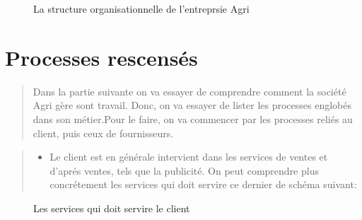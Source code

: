 \documentclass[a4paper]{report}
\begin{document}
\begin{doublespace}
\begin{figure}[H]
	\begin{center} 
		\caption{La structure organisationnelle de l'entreprsie Agri}
	\end{center}
\end{figure}

\section{Processes rescensés}

\begin{quote}
Dans la partie suivante on va essayer de comprendre comment la société
Agri gère sont travail. Donc, on va essayer de lister les processes
englobés dans son métier.Pour le faire, on va commencer par les
processes reliés au client, puis ceux de fournisseurs.
\end{quote}

\begin{quote}
\begin{itemize}
\item
  Le client est en générale intervient dans les services de ventes et
  d'aprés ventes, tels que la publicité. On peut comprendre plus
  concrétement les services qui doit servire ce dernier de schéma
  suivant:
\end{itemize}
\end{quote}

\begin{figure}[H] 
	\begin{center}
		\caption{Les services qui doit servire le client}
	\end{center}
\end{figure}


\end{doublespace}
\end{document}
